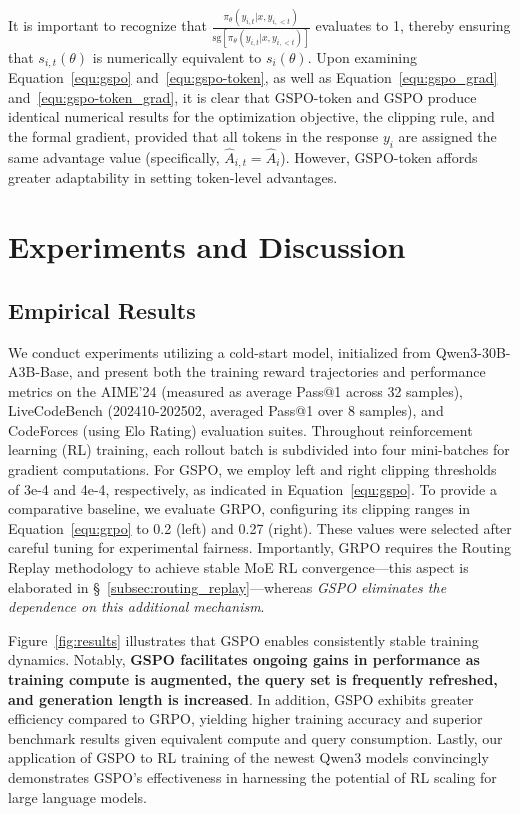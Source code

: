It is important to recognize that $\frac{ \pi_{\theta} (y_{i,t} | x, y_{i,<t}) }{ \mathrm{sg} \left[ \pi_{\theta} (y_{i,t} | x, y_{i,<t}) \right] }$ evaluates to 1, thereby ensuring that $s_{i,t}(\theta)$ is numerically equivalent to $s_{i}(\theta)$.
Upon examining Equation~\eqref{equ:gspo} and~\eqref{equ:gspo-token}, as well as Equation~\eqref{equ:gspo_grad} and~\eqref{equ:gspo-token_grad}, it is clear that GSPO-token and GSPO produce identical numerical results for the optimization objective, the clipping rule, and the formal gradient, provided that all tokens in the response $y_i$ are assigned the same advantage value (specifically, $\widehat{A}_{i,t} = \widehat{A}_{i}$). However, GSPO-token affords greater adaptability in setting token-level advantages.

\section{Experiments and Discussion}

\subsection{Empirical Results}

We conduct experiments utilizing a cold-start model, initialized from Qwen3-30B-A3B-Base, and present both the training reward trajectories and performance metrics on the AIME'24 (measured as average Pass@1 across 32 samples), LiveCodeBench (202410-202502, averaged Pass@1 over 8 samples), and CodeForces (using Elo Rating) evaluation suites. Throughout reinforcement learning (RL) training, each rollout batch is subdivided into four mini-batches for gradient computations. For GSPO, we employ left and right clipping thresholds of 3e-4 and 4e-4, respectively, as indicated in Equation~\eqref{equ:gspo}. To provide a comparative baseline, we evaluate GRPO, configuring its clipping ranges in Equation~\eqref{equ:grpo} to 0.2 (left) and 0.27 (right). These values were selected after careful tuning for experimental fairness. Importantly, GRPO requires the Routing Replay methodology to achieve stable MoE RL convergence—this aspect is elaborated in \S~\ref{subsec:routing_replay}—whereas \textit{GSPO eliminates the dependence on this additional mechanism}.

Figure~\ref{fig:results} illustrates that GSPO enables consistently stable training dynamics. Notably, \textbf{GSPO facilitates ongoing gains in performance as training compute is augmented, the query set is frequently refreshed, and generation length is increased}. In addition, GSPO exhibits greater efficiency compared to GRPO, yielding higher training accuracy and superior benchmark results given equivalent compute and query consumption. Lastly, our application of GSPO to RL training of the newest Qwen3 models convincingly demonstrates GSPO’s effectiveness in harnessing the potential of RL scaling for large language models.


